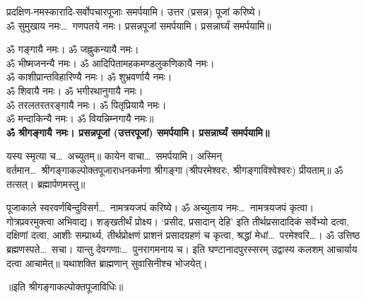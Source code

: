 
प्रदक्षिण-नमस्कारादि-सर्वोपचारपूजाः समर्पयामि। उत्तर (प्रसन्न) पूजां करिष्ये।\\
ॐ सुमुखाय नमः\ldots\ गणपतये नमः। प्रसन्नपूजां समर्पयामि। प्रसन्नार्घ्यं समर्पयामि॥

\begin{center}
ॐ गङ्गायै नमः। ॐ जह्नुकन्यायै नमः।\\
ॐ भीष्मजनन्यै नमः। ॐ आदिपितामहकमण्डलुकणिकायै नमः।\\
ॐ काशीप्रान्तविहारिण्यै नमः। ॐ शुभ्रवर्णायै नमः।\\
ॐ शिवायै नमः। ॐ भगीरथानुगायै नमः।\\
ॐ तरलतरतरङ्गायै नमः। ॐ पितृप्रियायै नमः।\\
ॐ मन्दाकिन्यै नमः। ॐ वियन्निम्नगायै नमः॥\\
\textbf{ॐ श्रीगङ्गायै नमः। प्रसन्नपूजां (उत्तरपूजां) समर्पयामि। प्रसन्नार्घ्यं समर्पयामि॥}
\end{center}

यस्य स्मृत्या च\ldots\ अच्युतम्॥ कायेन वाचा\ldots\ समर्पयामि।
अस्मिन् वर्तमान\ldots\ श्रीगङ्गाकल्पोक्तपूजाराधनकर्मणा श्रीगङ्गा (श्रीपरमेश्वरः,
श्रीगङ्गाविश्वेश्वरः) प्रीयताम्॥ ॐ तत्सत्। ब्रह्मार्पणमस्तु॥

पूजाकाले स्वरवर्णबिन्दुविसर्ग\ldots\ नामत्रयजपं करिष्ये। ॐ अच्युताय नमः\ldots\
नामत्रयजपं कृत्वा। गोत्रप्रवरमुक्त्वा अभिवाद्य। शङ्खतीर्थं प्रोक्ष्य। `प्रसीद, प्रसादान् देहि'
इति तीर्थप्रसादादिकं सर्वेभ्यो दत्वा, दक्षिणां दत्वा, आशीः सम्प्रार्थ्य, तीर्थप्रोक्षणं प्राशनं
प्रसादग्रहणं च कृत्वा, श्रद्धां मेधां\ldots\ परमेश्वरि\ldots। ॐ उत्तिष्ठ ब्रह्मणस्पते\ldots\ सचा।
यान्तु देवगणाः\ldots\ पुनरागमनाय च। इति घण्टानादपुरस्सरम् उद्वास्य कलशम् आचार्याय दत्वा
आचामेत्॥ यथाशक्ति ब्राह्मणान् सुवासिनीश्च भोजयेत्।

\centerline{॥इति श्रीगङ्गाकल्पोक्तपूजाविधिः॥}
